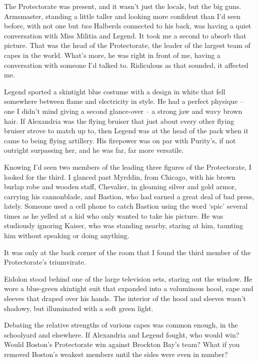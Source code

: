 The Protectorate was present, and it wasn't just the locals, but the big guns.  Armsmaster, standing a little taller and looking more confident than I'd seen before, with not one but \emph{two} Halberds connected to his back, was having a quiet conversation with Miss Militia and Legend.  It took me a second to absorb that picture.  That was the head of the Protectorate, the leader of the largest team of capes in the world.  What's more, he was right in front of me, having a conversation with someone I'd talked to.  Ridiculous as that sounded, it affected me.



Legend sported a skintight blue costume with a design in white that fell somewhere between flame and electricity in style.  He had a perfect physique – one I didn't mind giving a second glance-over – a strong jaw and wavy brown hair.  If Alexandria was the flying bruiser that just about every other flying bruiser strove to match up to, then Legend was at the head of the pack when it came to being flying artillery.  His firepower was on par with Purity's, if not outright surpassing her, and he was far, far more versatile.



Knowing I'd seen two members of the leading three figures of the Protectorate, I looked for the third.  I glanced past Myrddin, from Chicago, with his brown burlap robe and wooden staff, Chevalier, in gleaming silver and gold armor, carrying his cannonblade, and Bastion, who had earned a great deal of bad press, lately. Someone used a cell phone to catch Bastion using the word `spic' several times as he yelled at a kid who only wanted to take his picture.  He was studiously ignoring Kaiser, who was standing nearby, staring at him, taunting him without speaking or doing anything.



It was only at the back corner of the room that I found the third member of the Protectorate's triumvirate.



Eidolon stood behind one of the large television sets, staring out the window.  He wore a blue-green skintight suit that expanded into a voluminous hood, cape and sleeves that draped over his hands.  The interior of the hood and sleeves wasn't shadowy, but illuminated with a soft green light.



Debating the relative strengths of various capes was common enough, in the schoolyard and elsewhere.  If Alexandria and Legend fought, who would win?  Would Boston's Protectorate win against Brockton Bay's team?  What if you removed Boston's weakest members until the sides were even in number?



